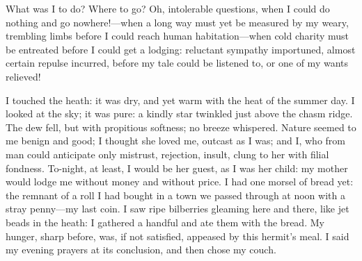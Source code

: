 What was I to do? Where to go? Oh, intolerable questions, when I could
do nothing and go nowhere!---when a long way must yet be measured by my
weary, trembling limbs before I could reach human habitation---when cold
charity must be entreated before I could get a lodging: reluctant
sympathy importuned, almost certain repulse incurred, before my tale
could be listened to, or one of my wants relieved!

I touched the heath: it was dry, and yet warm with the heat of the
summer day. I looked at the sky; it was pure: a kindly star twinkled
just above the chasm ridge. The dew fell, but with propitious softness;
no breeze whispered. Nature seemed to me benign and good; I thought she
loved me, outcast as I was; and I, who from man could anticipate only
mistrust, rejection, insult, clung to her with filial fondness. 
To-night, at least, I would be her guest, as I was her child: my mother
would lodge me without money and without price. I had one morsel of
bread yet: the remnant of a roll I had bought in a town we passed
through at noon with a stray penny---my last coin. I saw ripe
bilberries gleaming here and there, like jet beads in the heath: I
gathered a handful and ate them with the bread. My hunger, sharp
before, was, if not satisfied, appeased by this hermit's meal. I said
my evening prayers at its conclusion, and then chose my couch.

